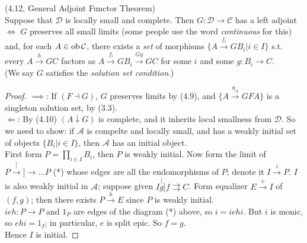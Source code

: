 \documentclass[a4paper]{article}
\begin{document}
\begin{thm} (4.12, General Adjoint Functor Theorem)\\
    Suppose that $\mathcal{D}$ is locally small and complete. Then $G:\mathcal{D} \to \mathcal{C}$ has a left adjoint $\iff$ $G$ preserves all small limits (some people use the word \emph{continuous} for this) and, for each $A \in \operatorname{ob}\mathcal{C}$, there exists a \emph{set} of morphisms $\{A \xrightarrow{f_i} GB_i | i \in I\}$ s.t. every $A \xrightarrow{h} GC$ factors as $A \xrightarrow{f_i} GB_i \xrightarrow{Gg} GC$ for some $i$ and some $g:B_i \to C$.\\
    (We say $G$ satisfies the \emph{solution set condition}.)
    \begin{proof}
        $\implies$: If $(F \dashv G)$, $G$ preserves limits by (4.9), and $\{A \xrightarrow{\eta_A} GFA\}$ is a singleton solution set, by (3.3).\\
        $\Leftarrow$: By (4.10) $(A\downarrow G)$ is complete, and it inherits local smallness from $\mathcal{D}$. So we need to show: if $\mathcal{A}$ is compelte and locally small, and has a weakly initial set of objects $\{B_i | i \in I\}$, then $\mathcal{A}$ has an initial object.\\
        First form $P=\prod_{i \in I} B_i$, then $P$ is weakly initial. Now form the limit of $P \stackrel[\to]{\to}{...} P$ (*) whose edges are all the endomorphisms of $P$; denote it $I \xrightarrow{i} P$. $I$ is also weakly initial in $\mathcal{A}$; suppose given $I \stackrel[g]{f}{\rightrightarrows} C$. Form equalizer $E \xrightarrow{e} I$ of $(f,g)$; then there exists $P\xrightarrow{h} E$ since $P$ is weakly initial.\\
        $ieh:P \to P$ and $1_P$ are edges of the diagram (*) above, so $i=iehi$. But $i$ is monic, so $ehi = 1_I$; in particular, $e$ is split epic. So $f=g$.\\
        Hence $I$ is initial.
    \end{proof}
\end{thm}
\end{document}
